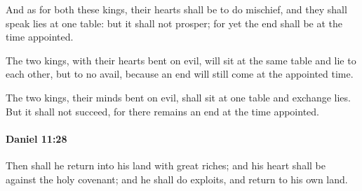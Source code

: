 			\begin{versebox}
					\item[BHS] 
					\item[LXX] 
					\item[ASV] And as for both these kings, their hearts shall be to do mischief, and they shall speak lies at one table: but it shall not prosper; for yet the end shall be at the time appointed.
					\item[NIV] The two kings, with their hearts bent on evil, will sit at the same table and lie to each other, but to no avail, because an end will still come at the appointed time.
					\item[NRSV] The two kings, their minds bent on evil, shall sit at one table and exchange lies. But it shall not succeed, for there remains an end at the time appointed.
			\end{versebox}

		\paragraph{Daniel 11:28} %
			\label{DANIEL-11-28}

			Then shall he return into his land with great riches; and his heart shall be against the holy covenant; and he shall do exploits, and return to his own land.

